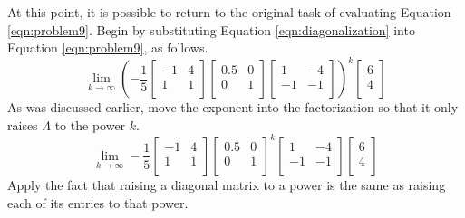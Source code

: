 \documentclass[titlepage]{article}
\begin{document}
At this point, it is possible to return to the original task of evaluating Equation \ref{eqn:problem9}. Begin by substituting Equation \ref{eqn:diagonalization} into Equation \ref{eqn:problem9}, as follows.
\begin{equation*}
    \lim_{k\to\infty}
    \left( 
        -\frac{1}{5}
        \begin{bmatrix}
            -1 & 4\\
            1 & 1\\
        \end{bmatrix}
        \begin{bmatrix}
            0.5 & 0\\
            0 & 1\\
        \end{bmatrix}
        \begin{bmatrix}
            1 & -4\\
            -1 & -1\\
        \end{bmatrix}
    \right)^k
    \begin{bmatrix}
        6\\
        4\\
    \end{bmatrix}
\end{equation*}
As was discussed earlier, move the exponent into the factorization so that it only raises $\Lambda$ to the power $k$.
\begin{equation*}
    \lim_{k\to\infty} -\frac{1}{5}
    \begin{bmatrix}
        -1 & 4\\
        1 & 1\\
    \end{bmatrix}
    \begin{bmatrix}
        0.5 & 0\\
        0 & 1\\
    \end{bmatrix}^k
    \begin{bmatrix}
        1 & -4\\
        -1 & -1\\
    \end{bmatrix}
    \begin{bmatrix}
        6\\
        4\\
    \end{bmatrix}
\end{equation*}
Apply the fact that raising a diagonal matrix to a power is the same as raising each of its entries to that power.
\end{document}
